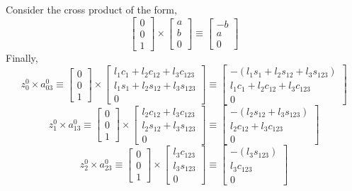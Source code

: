 \documentclass[12pt]{article}
\begin{document}
Consider the cross product of the form,
\[
  \begin{bmatrix} 0 \\ 0 \\ 1 \end{bmatrix} \times \begin{bmatrix} a \\ b \\ 0 \end{bmatrix}
  \equiv
  \begin{bmatrix} -b \\ a \\ 0 \end{bmatrix}
\]
Finally,
\[
  z_0^0 \times a_{03}^0 \equiv
  \begin{bmatrix} 0 \\ 0 \\ 1 \end{bmatrix} \times
  \begin{bmatrix}
    l_1c_1 + l_2c_{12} + l_3c_{123}\\
    l_1s_1 + l_2s_{12} + l_3s_{123}\\
    0
  \end{bmatrix}
  \equiv
  \begin{bmatrix}
    -(l_1s_1 + l_2s_{12} + l_3s_{123})\\
    l_1c_1 + l_2c_{12} + l_3c_{123}\\
    0
  \end{bmatrix}
\]
\[
  z_1^0 \times a_{13}^0 \equiv
  \begin{bmatrix} 0 \\ 0 \\ 1 \end{bmatrix} \times
  \begin{bmatrix}
    l_2c_{12} + l_3c_{123}\\
    l_2s_{12} + l_3s_{123}\\
    0
  \end{bmatrix}
  \equiv
  \begin{bmatrix}
    -(l_2s_{12} + l_3s_{123})\\
    l_2c_{12} + l_3c_{123}\\
    0
  \end{bmatrix}
\]
\[
  z_2^0 \times a_{23}^0 \equiv
  \begin{bmatrix} 0 \\ 0 \\ 1 \end{bmatrix} \times
  \begin{bmatrix}
    l_3c_{123}\\
    l_3s_{123}\\
    0
  \end{bmatrix}
  \equiv
  \begin{bmatrix}
    -(l_3s_{123})\\
    l_3c_{123}\\
    0
  \end{bmatrix}
\]
\end{document}

